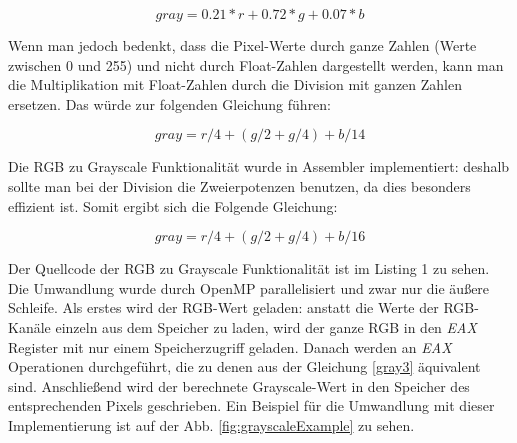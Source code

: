\documentclass[11pt]{amsart}
\begin{document}
 \begin{equation}\label{gray1}
 	gray = 0.21*r + 0.72*g + 0.07*b
\end{equation}

Wenn man jedoch bedenkt, dass die Pixel-Werte durch ganze Zahlen (Werte zwischen 0 und 255) und nicht durch Float-Zahlen dargestellt werden, kann man die Multiplikation mit Float-Zahlen durch die Division mit ganzen Zahlen ersetzen. Das würde zur folgenden Gleichung führen:

 \begin{equation}\label{gray2}
 	gray = r/4 + (g/2 + g/4) + b/14
\end{equation}

Die RGB zu Grayscale Funktionalität wurde in Assembler implementiert: deshalb sollte man bei der Division die Zweierpotenzen benutzen, da dies besonders effizient ist. Somit ergibt sich die Folgende Gleichung:

 \begin{equation}\label{gray3}
 	gray = r/4 + (g/2 + g/4) + b/16
\end{equation}

Der Quellcode der RGB zu Grayscale Funktionalität ist im Listing 1 zu sehen. Die Umwandlung wurde durch OpenMP parallelisiert und zwar nur die äußere Schleife. Als erstes wird der RGB-Wert geladen: anstatt die Werte der RGB-Kanäle einzeln aus dem Speicher zu laden, wird der ganze RGB in den \textit{EAX} Register mit nur einem Speicherzugriff geladen. Danach werden an \textit{EAX} Operationen durchgeführt, die zu denen aus der Gleichung \ref{gray3} äquivalent sind. Anschließend wird der berechnete Grayscale-Wert in den Speicher des entsprechenden Pixels geschrieben. Ein Beispiel für die Umwandlung mit dieser Implementierung ist auf der Abb. \ref{fig:grayscaleExample} zu sehen.
\end{document}
